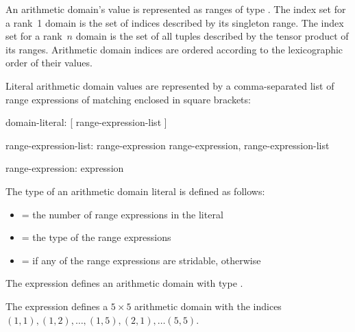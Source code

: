 An arithmetic domain's value is represented as  ranges of
 type   .  The index set for a rank~1 domain is the set of indices
 described by its singleton range.  The index set for a rank~$n$
 domain is the set of all  tuples described by the
 tensor product of its ranges.  Arithmetic domain indices are ordered
 according to the lexicographic order of their values.


Literal arithmetic domain values are represented by a comma-separated
list of range expressions of matching  enclosed in
square brackets:

%
%

\begin{syntax}
domain-literal:
  [ range-expression-list ]

range-expression-list:
  range-expression
  range-expression, range-expression-list

range-expression:
  expression
\end{syntax}

\noindent The type of an arithmetic domain literal is defined as follows:

\begin{itemize}

\item {} = the number of range expressions in the literal

\item {} = the type of the range expressions

\item {} =  if any of the range expressions
are stridable, otherwise 

\end{itemize}

\begin{example}
The expression \chpl{[1..5, 1..5]} defines an arithmetic domain with
type   .
\end{example}

\begin{example}
The expression \chpl{[1..5, 1..5]} defines a $5 \times 5$ arithmetic
domain with the indices $(1, 1), (1, 2), \ldots, (1, 5), (2, 1), \ldots (5, 5)$.
\end{example}

